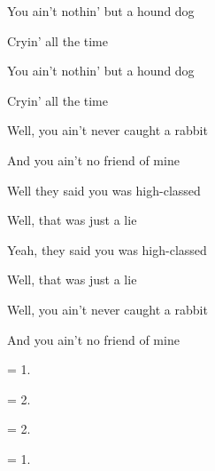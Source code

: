 

\zs
You ain't nothin' but a hound dog

Cryin' all the time

You ain't nothin' but a hound dog

Cryin' all the time

Well, you ain't never caught a rabbit

And you ain't no friend of mine
\ks

\zs
Well they said you was high-classed
                    
Well, that was just a lie

Yeah, they said you was high-classed

Well, that was just a lie

Well, you ain't never caught a rabbit

And you ain't no friend of mine
\ks

\zs
= 1.
\ks

\zs
= 2.
\ks

\zs
= 2.
\ks

\zs
= 1.
\ks

\kp
